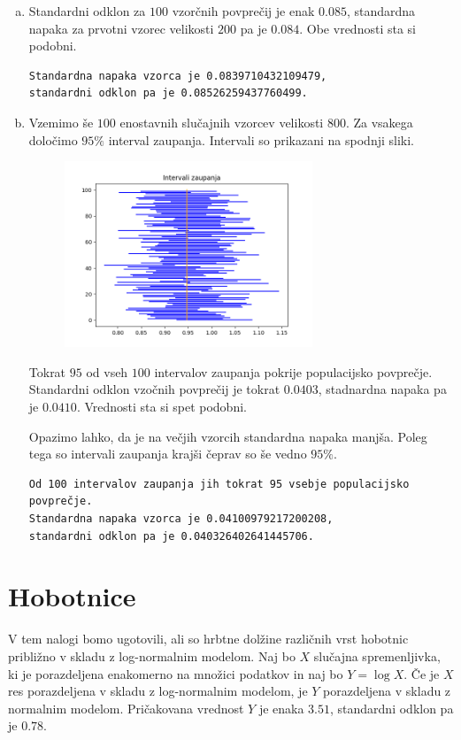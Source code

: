 \documentclass[a4paper,12pt]{article}
\theoremstyle{definition}
\theoremstyle{plain}
\begin{document}
\begin{enumerate}[a)]
    \item Standardni odklon za $100$ vzorčnih povprečij je enak $0.085$, standardna napaka za prvotni vzorec velikosti $200$ pa je $0.084$. Obe vrednosti sta si podobni.

    \begin{verbatim}
Standardna napaka vzorca je 0.0839710432109479, 
standardni odklon pa je 0.08526259437760499.
    \end{verbatim}
    
    \item Vzemimo še $100$ enostavnih slučajnih vzorcev velikosti $800$. Za vsakega določimo $95 \%$ interval zaupanja. Intervali so prikazani na spodnji sliki.
    
    \begin{figure}[H]
        \centering
        \label{fig:iz2}
        \includegraphics[width=0.7\textwidth]{intervaliZaupanja2.png}
    \end{figure}

    Tokrat $95$ od vseh $100$ intervalov zaupanja pokrije populacijsko povprečje.
    Standardni odklon vzočnih povprečij je tokrat $0.0403$, stadnardna napaka pa je $0.0410$. Vrednosti sta si spet podobni.

    Opazimo lahko, da je na večjih vzorcih standardna napaka manjša. Poleg tega so intervali zaupanja krajši čeprav so še vedno $95 \%$.

    \begin{verbatim}
Od 100 intervalov zaupanja jih tokrat 95 vsebje populacijsko 
povprečje.
Standardna napaka vzorca je 0.04100979217200208, 
standardni odklon pa je 0.040326402641445706.
    \end{verbatim}
\end{enumerate}


\section{Hobotnice}
V tem nalogi bomo ugotovili, ali so hrbtne dolžine različnih vrst hobotnic približno v skladu z log-normalnim modelom. Naj bo $X$ slučajna spremenljivka, ki je porazdeljena enakomerno na množici podatkov in naj bo $Y = \log{X}$. Če je $X$ res porazdeljena v skladu z log-normalnim modelom, je $Y$ porazdeljena v skladu z normalnim modelom. Pričakovana vrednost $Y$ je enaka $3.51$, standardni odklon pa je $0.78$.
\end{document}
